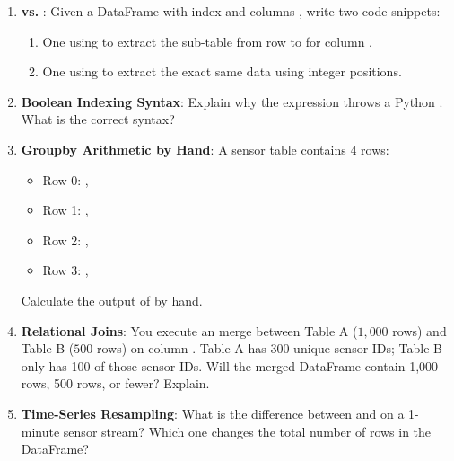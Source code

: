 \begin{enumerate}
    \item \textbf{ vs. }: Given a DataFrame with index \code{['A', 'B', 'C', 'D']} and columns , write two code snippets:
    \begin{enumerate}[label=(\alph*)]
        \item One using  to extract the sub-table from row  to  for column .
        \item One using  to extract the exact same data using integer positions.
    \end{enumerate}

    \item \textbf{Boolean Indexing Syntax}: Explain why the expression  throws a Python . What is the correct syntax?

    \item \textbf{Groupby Arithmetic by Hand}: A sensor table contains 4 rows:
    \begin{itemize}
        \item Row 0: , 
        \item Row 1: , 
        \item Row 2: , 
        \item Row 3: , 
    \end{itemize}
    Calculate the output of  by hand.

    \item \textbf{Relational Joins}: You execute an  merge between Table A ($1{,}000$ rows) and Table B ($500$ rows) on column . Table A has 300 unique sensor IDs; Table B only has 100 of those sensor IDs. Will the merged DataFrame contain 1,000 rows, 500 rows, or fewer? Explain.

    \item \textbf{Time-Series Resampling}: What is the difference between  and  on a 1-minute sensor stream? Which one changes the total number of rows in the DataFrame?
\end{enumerate}


